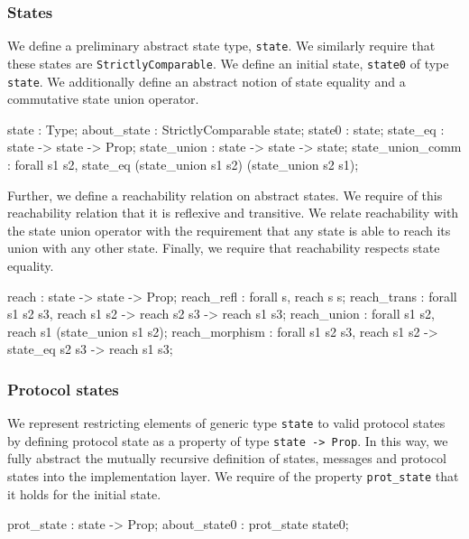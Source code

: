 \documentclass[runningheads]{llncs}
\begin{document}
\subsubsection{States}
We define a preliminary abstract state type, \verb|state|. We similarly require that these states are \verb|StrictlyComparable|. We define an initial state, \verb|state0| of type \verb|state|. We additionally define an abstract notion of state equality and a commutative state union operator.
\begin{coq}
	state : Type;
	about_state : StrictlyComparable state;
	state0 : state;
	state_eq : state -> state -> Prop;
	state_union : state -> state -> state;
	state_union_comm : forall s1 s2, state_eq (state_union s1 s2)
	(state_union s2 s1);
\end{coq}
Further, we define a reachability relation on abstract states. We require of this reachability relation that it is reflexive and transitive. We relate reachability with the state union operator with the requirement that any state is able to reach its union with any other state. Finally, we require that reachability respects state equality.
\begin{coq}
	reach : state -> state -> Prop;
	reach_refl : forall s, reach s s;
	reach_trans : forall s1 s2 s3, reach s1 s2 ->
	reach s2 s3 ->
	reach s1 s3;
	reach_union : forall s1 s2, reach s1 (state_union s1 s2); 
	reach_morphism : forall s1 s2 s3, reach s1 s2 ->
	state_eq s2 s3 ->
	reach s1 s3; 
\end{coq}

\subsubsection{Protocol states}
We represent restricting elements of generic type \verb|state| to valid protocol states by defining protocol state as a property of type \verb|state -> Prop|. In this way, we fully abstract the mutually recursive definition of states, messages and protocol states into the implementation layer. We require of the property \verb|prot_state| that it holds for the initial state.
\begin{coq}
	prot_state : state -> Prop;
	about_state0 : prot_state state0;
\end{coq}
\end{document}
